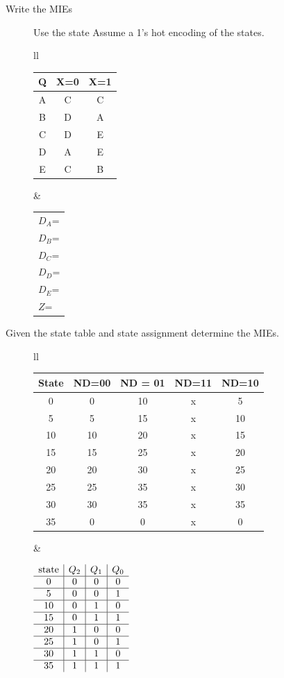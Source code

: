 \begin{description}
\item[Write the MIEs]  Use the state Assume a 1's hot encoding of the states.

\begin{tabular}{ll}
\begin{tabular}{c||c|c}
Q	& X=0	& X=1 \\ \hline
A	& C	& C	\\ \hline
B	& D	& A	\\ \hline
C	& D	& E	\\ \hline
D	& A	& E	\\ \hline
E	& C	& B	\\ 
\end{tabular}
&
	\begin{tabular}{l}
	$D_A$= \\
	$D_B$= \\
	$D_C$= \\
	$D_D$= \\
	$D_E$= \\
	$Z$= \\
	\end{tabular}
\end{tabular}

\pagebreak

\item[Given the state table and state assignment determine the MIEs.]
\begin{tabular}{ll}
\begin{tabular}{c||c|c|c|c}
State & ND=00 & ND = 01 & ND=11 & ND=10 \\ \hline
0     & 0	& 10	  & x	  & 5 	  \\ \hline
5     & 5	& 15	  & x	  & 10 	  \\ \hline
10    & 10	& 20	  & x	  & 15 	  \\ \hline
15    & 15	& 25	  & x	  & 20 	  \\ \hline
20    & 20	& 30	  & x	  & 25 	  \\ \hline
25    & 25	& 35	  & x	  & 30 	  \\ \hline
30    & 30	& 35	  & x	  & 35 	  \\ \hline
35    & 0	& 0	  & x	  & 0 	  \\ 
\end{tabular}
&

$\begin{array}{c|c|c|c}
{\rm state} & Q_2 & Q_1 & Q_0 \\ \hline
0  & 0 & 0 & 0 \\ \hline
5  & 0 & 0 & 1 \\ \hline
10 & 0 & 1 & 0 \\ \hline
15 & 0 & 1 & 1 \\ \hline
20 & 1 & 0 & 0 \\ \hline
25 & 1 & 0 & 1 \\ \hline
30 & 1 & 1 & 0 \\ \hline
35 & 1 & 1 & 1 \\ 
\end{array}$ \\
\end{tabular}


\end{description}
